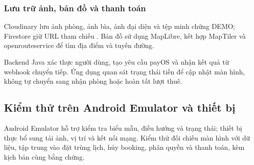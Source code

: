 \subsubsection{Lưu trữ ảnh, bản đồ và thanh toán}
Cloudinary lưu ảnh phòng, ảnh bìa, ảnh đại diện và tệp minh chứng DEMO; Firestore giữ URL tham chiếu \parencite{cloudinary_android}. Bản đồ sử dụng MapLibre, kết hợp MapTiler và openrouteservice để tìm địa điểm và tuyến đường.

Backend Java xác thực người dùng, tạo yêu cầu payOS và nhận kết quả từ webhook chuyển tiếp. Ứng dụng quan sát trạng thái tiền để cập nhật màn hình, không tự chuyển sang nhận phòng hoặc hoàn tất lượt thuê.

\subsection{Kiểm thử trên Android Emulator và thiết bị}
Android Emulator hỗ trợ kiểm tra biểu mẫu, điều hướng và trạng thái; thiết bị thực bổ sung tải ảnh, vị trí và kết nối mạng. Kiểm thử đối chiếu màn hình với dữ liệu, tập trung vào đặt trùng lịch, hủy booking, phân quyền và thanh toán, kèm kịch bản cùng bằng chứng.

